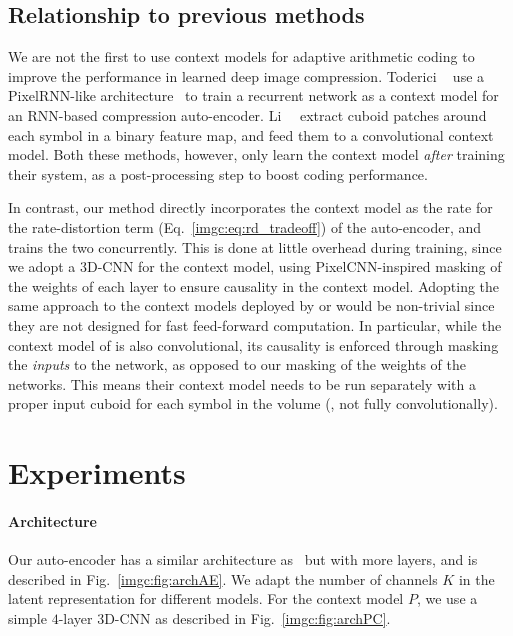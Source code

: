 \subsection{Relationship to previous methods}
We are not the first to use context models for adaptive arithmetic coding to improve the performance in learned deep image compression. Toderici \etal~\cite{toderici2016full} use a PixelRNN-like architecture~\cite{van2016pixel} to train a recurrent network as a context model for an RNN-based compression auto-encoder.
Li~\etal~\cite{li2017learning} extract cuboid patches around each symbol in a binary feature map, and feed them to a convolutional context model.   
Both these methods, however, only learn the context model \textit{after} training their system, as a post-processing step to boost coding performance. 

In contrast, our method directly incorporates the context model as the rate for the rate-distortion term (Eq.~\eqref{imgc:eq:rd_tradeoff}) of the auto-encoder, and trains the two concurrently. This is done at little overhead during training, since we adopt a 3D-CNN for the context model, using PixelCNN-inspired \cite{van2016conditional} masking of the weights of each layer to ensure causality in the context model. 
Adopting the same approach to the context models deployed by \cite{toderici2016full} or \cite{li2017learning} would be non-trivial since they are not designed for fast feed-forward computation.  In particular, while the context model of \cite{li2017learning} is also convolutional, its causality is enforced through masking the \textit{inputs} to the network, as opposed to our masking of the weights of the networks. This means their context model needs to be run separately with a proper input cuboid for each symbol in the volume (\ie, not fully convolutionally).


\section{Experiments}
\label{imgc:sec:experiments}

\paragraph{Architecture} Our auto-encoder has a similar architecture as~\cite{theis2017lossy} but with more layers, and is described in Fig.~\ref{imgc:fig:archAE}. We adapt the number of channels $K$ in the latent representation for different models.
For the context model $P$, we use a simple $4$-layer 3D-CNN as described in Fig.~\ref{imgc:fig:archPC}. 

